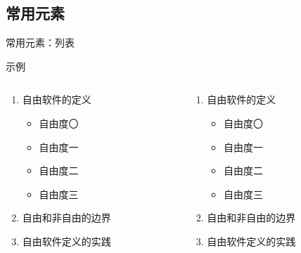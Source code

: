 \subsection{常用元素}

\begin{frame}[fragile]{常用元素：列表}
  \begin{exampleblock}{示例}
    \begin{columns}
      \begin{column}{0.45\textwidth}
        \begin{texcode}[gobble=10, emph={[1]enumerate,itemize}]
          \begin{enumerate}
            \item 自由软件的定义
              \begin{itemize}
                \item 自由度〇
                \item 自由度一
                \item 自由度二
                \item 自由度三
              \end{itemize}
            \item 自由和非自由的边界
            \item 自由软件定义的实践
          \end{enumerate}
        \end{texcode}
      \end{column}

      \begin{column}{0.45\textwidth}
        \begin{enumerate}
          \item 自由软件的定义
                \begin{itemize}
                  \item 自由度〇
                  \item 自由度一
                  \item 自由度二
                  \item 自由度三
                \end{itemize}
          \item 自由和非自由的边界
          \item 自由软件定义的实践
        \end{enumerate}
      \end{column}
    \end{columns}
  \end{exampleblock}

\end{frame}

